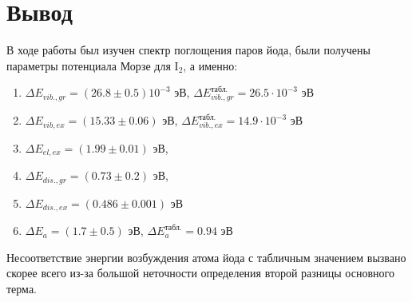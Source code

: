 \documentclass[11.5pt,a4paper,russian]{article}
\begin{document}
\section{Вывод}
В ходе работы был изучен спектр поглощения паров йода, были получены параметры потенциала Морзе для $\mathrm{I}_2$, а именно:

\begin{enumerate}
  \item $\Delta E_{v i b ., g r} = (26.8 \pm 0.5) 10^{-3}$ эВ, $\Delta E^{\text{табл.}}_{v i b ., g r} = 26.5 \cdot 10^{-3}$ эВ
  \item $\Delta E_{vib, ex} = (15.33 \pm 0.06)$ эВ,  $\Delta E^{\text{табл.}}_{v i b ., ex} = 14.9 \cdot 10^{-3}$ эВ
  \item $\Delta E_{el, ex} = (1.99 \pm 0.01)$ эВ,
  \item $\Delta E_{d i s ., gr} = (0.73 \pm 0.2)$ эВ,
  \item $\Delta E_{d i s ., ex} = (0.486 \pm 0.001)$ эВ
  \item $\Delta E_a =  (1.7 \pm 0.5)$ эВ,  $\Delta E^{\text{табл.}}_{a} = 0.94$ эВ
\end{enumerate}

Несоответствие энергии возбуждения атома йода с табличным значением вызвано скорее всего из-за большой неточности определения второй разницы основного терма.
\end{document}
